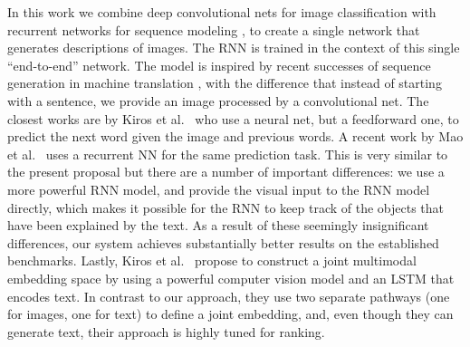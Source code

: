 In this work we combine deep
convolutional nets for image classification \cite{batchnorm} with
recurrent networks for sequence modeling
\cite{hochreiter1997long}, to create a single network
that generates descriptions of images. The RNN is trained in the context of
this single ``end-to-end'' network. The model is inspired
by recent successes of sequence generation in machine translation
\cite{cho2014learning,bahdanau2014neural,sutskever2014sequence}, with
the difference that instead of starting with a sentence, we provide an image
processed by a convolutional net. The closest works are by Kiros et al.~\cite{kiros2013multimodal} who
use a neural net, but a feedforward one, to predict the next word given the image
and previous words. A recent work by Mao et al.~\cite{baidu2014} uses a recurrent
NN for the same prediction task. This is very similar to the present proposal but
there are a number of important differences:  we use a more powerful RNN model,
and provide the visual input to the RNN model directly, which makes it possible
for the RNN to keep track of the objects that have been explained by the text.  As
a result of these seemingly insignificant differences, our system achieves
substantially better results on the established benchmarks. Lastly, Kiros et al.~\cite{kiros2014}
propose to construct a joint multimodal embedding space by using a powerful
computer vision model and an LSTM that encodes text. In contrast to our approach,
they use two separate pathways (one for images, one for text) to define a joint embedding,
and, even though they can generate text, their approach is highly tuned for ranking.

